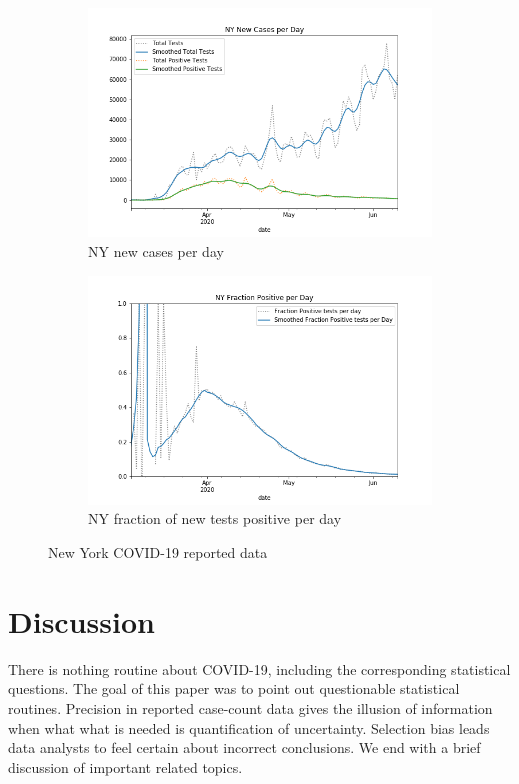 \documentclass[11pt]{amsart}
\begin{document}
\begin{figure}
\centering
\begin{subfigure}{.5\textwidth}
  \centering
  \includegraphics[width=.9\linewidth]{../methods/figs/NY_casecount.png}
  \caption{NY new cases per day}
  \label{fig:ny-covid-test}
\end{subfigure}%
\begin{subfigure}{.5\textwidth}
  \centering
  \includegraphics[width=.9\linewidth]{../methods/figs/NY_fracpos.png}
  \caption{NY fraction of new tests positive per day}
  \label{fig:ny-covid-frac}
\end{subfigure}
\caption{New York COVID-19 reported data}
\label{fig:ny-covid}
\end{figure}



\section{Discussion}
\label{section:discussion}
There is nothing routine about COVID-19, including the corresponding statistical questions.  The goal of this paper was to point out questionable statistical routines.  Precision in reported case-count data gives the illusion of information when what what is needed is quantification of uncertainty. Selection bias leads data analysts to feel certain about incorrect conclusions.  We end with a brief discussion of important related topics.
\end{document}
